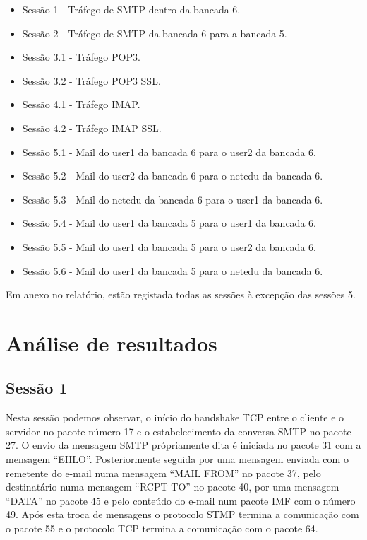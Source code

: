 \documentclass[a4paper,12pt]{article}
\begin{document}
\begin{itemize}
	\item Sessão 1 - Tráfego de SMTP dentro da bancada 6.
	\item Sessão 2 - Tráfego de SMTP da bancada 6 para a bancada 5.
	\item Sessão 3.1 - Tráfego POP3.
	\item Sessão 3.2 - Tráfego POP3 SSL.
	\item Sessão 4.1 - Tráfego IMAP.
	\item Sessão 4.2 - Tráfego IMAP SSL.
	\item Sessão 5.1 - Mail do user1 da bancada 6 para o user2 da bancada 6.
	\item Sessão 5.2 - Mail do user2 da bancada 6 para o netedu da bancada 6.
	\item Sessão 5.3 - Mail do netedu da bancada 6 para o user1 da bancada 6.
	\item Sessão 5.4 - Mail do user1 da bancada 5 para o user1 da bancada 6.
	\item Sessão 5.5 - Mail do user1 da bancada 5 para o user2 da bancada 6.
	\item Sessão 5.6 - Mail do user1 da bancada 5 para o netedu da bancada 6.
\end{itemize}

Em anexo no relatório, estão registada todas as sessões à excepção das
sessões 5.

\section{Análise de resultados}

\subsection{Sessão 1}

Nesta sessão podemos observar, o início do handshake TCP entre o cliente
e o servidor no pacote número 17 e o estabelecimento da conversa SMTP
no pacote 27. O envio da mensagem SMTP própriamente dita é iniciada no pacote
31 com a mensagem ``EHLO''. Posteriormente seguida por uma mensagem enviada
com o remetente do e-mail numa mensagem ``MAIL FROM'' no pacote 37, pelo 
destinatário numa mensagem ``RCPT TO'' no pacote 40, por uma mensagem ``DATA'' 
no pacote 45 e pelo conteúdo do e-mail num pacote IMF com o número 49. Após
esta troca de mensagens o protocolo STMP termina a comunicação com o pacote 55 e
o protocolo TCP termina a comunicação com o pacote 64.
\end{document}
